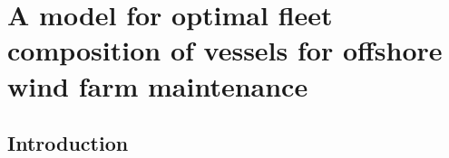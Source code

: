 %
%	
%
%
%
%

\newcommand\ceil[1]{\lceil#1\rceil}
\chapter{A model for optimal fleet composition of vessels for offshore wind farm maintenance} %
\label{Chap:iccs2017}

\ifpdf
    \graphicspath{{X/figures/PNG/}{X/figures/PDF/}{X/figures/}}
\else
    \graphicspath{{X/figures/EPS/}{X/figures/}}
\fi


\section{Introduction}


